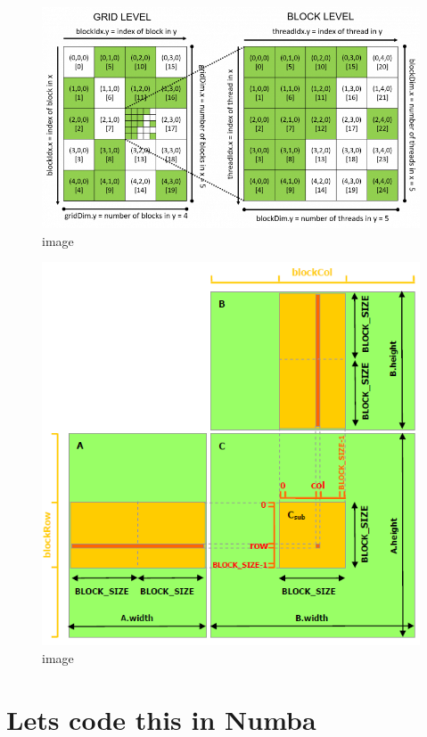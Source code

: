 \documentclass[11pt]{article}
\makeatletter
\def\maxwidth{\ifdim\Gin@nat@width>\linewidth\linewidth
    \else\Gin@nat@width\fi}
\let\Oldincludegraphics\includegraphics
\renewcommand{\includegraphics}[1]{\Oldincludegraphics[width=.8\maxwidth]{#1}}
\makeatother
\begin{document}
    \begin{figure}
\centering
\includegraphics{images/blocksmatmul.png}
\caption{image}
\end{figure}

    \begin{figure}
\centering
\includegraphics{images/tile.png}
\caption{image}
\end{figure}

    \section{Lets code this in Numba}\label{lets-code-this-in-numba}
\end{document}
